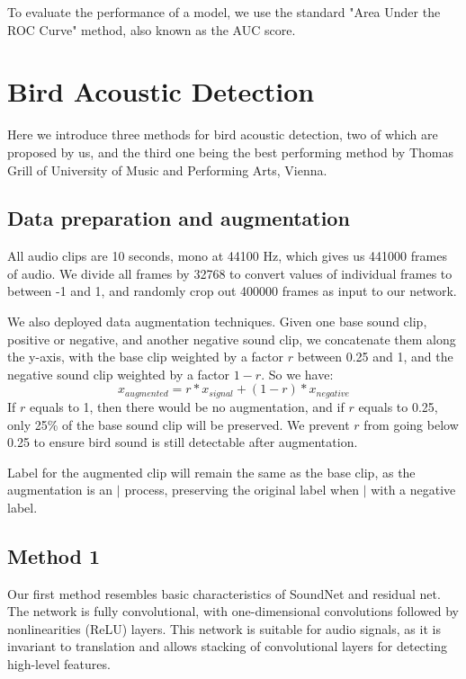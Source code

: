 \documentclass[10pt,twocolumn,letterpaper]{article}
\begin{document}
To evaluate the performance of a model, we use the standard "Area Under the
ROC Curve" method, also known as the AUC score.

\section{Bird Acoustic Detection}

Here we introduce three methods for bird acoustic detection, two of which
are proposed by us, and the third one being the best performing method by
Thomas Grill of University of Music and Performing Arts, Vienna. 

\subsection{Data preparation and augmentation}

All audio clips are 10 seconds, mono at 44100 Hz, which gives us 441000
frames of audio. We divide all frames by 32768 to convert values of
individual frames to between -1 and 1, and randomly crop out 400000 frames
as input to our network.

We also deployed data augmentation techniques. Given one base sound clip,
positive or negative, and another negative sound clip, we concatenate them
along the y-axis, with the base clip weighted by a factor \(r\) between 0.25
and 1, and the negative sound clip weighted by a factor \(1-r\). So we
have:
\begin{equation}
	x_{augmented}=r*x_{signal} + (1-r)*x_{negative}
\end{equation}
If \(r\) equals to 1, then there would be no augmentation, and if \(r\)
equals to 0.25, only 25\% of the base sound clip will be preserved. We
prevent \(r\) from going below 0.25 to ensure bird sound is still
detectable after augmentation.

Label for the augmented clip will remain the same as the base clip, as the
augmentation is an \(|\) process, preserving the original label when \(|\)
with a negative label.

\subsection{Method 1}

Our first method resembles basic characteristics of SoundNet and residual
net. The network is fully convolutional, with one-dimensional convolutions
followed by nonlinearities (ReLU) layers. This network is suitable for
audio signals, as it is invariant to translation and allows stacking of
convolutional layers for detecting high-level features.
\end{document}
